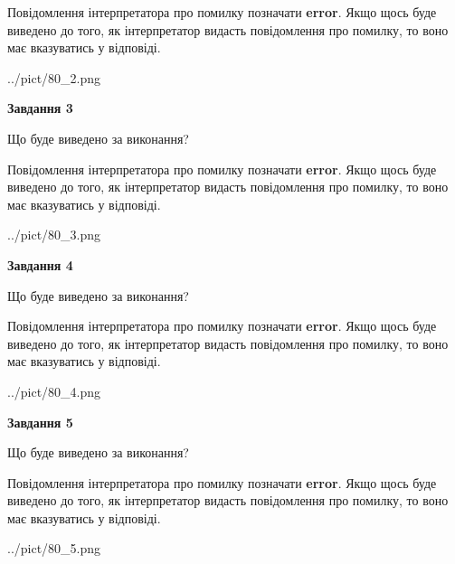 \documentclass[12pt, ukrainian]{article}
\begin{document}
{\begin {large}
Повідомлення інтерпретатора про помилку позначати \textbf{error}.
Якщо щось буде виведено до того, як інтерпретатор видасть повідомлення про помилку, 
то воно має вказуватись у відповіді. \par


\begin{center}
	{../pict/80_2.png}
\end{center}
\newpage

{\begin {center}\textbf{Завдання 3}\end {center}}\par
Що буде виведено за виконання?

Повідомлення інтерпретатора про помилку позначати \textbf{error}.
Якщо щось буде виведено до того, як інтерпретатор видасть повідомлення про помилку, 
то воно має вказуватись у відповіді. \par


\begin{center}
	{../pict/80_3.png}
\end{center}
\newpage

{\begin {center}\textbf{Завдання 4}\end {center}}\par
Що буде виведено за виконання?

Повідомлення інтерпретатора про помилку позначати \textbf{error}.
Якщо щось буде виведено до того, як інтерпретатор видасть повідомлення про помилку, 
то воно має вказуватись у відповіді. \par


\begin{center}
	{../pict/80_4.png}
\end{center}
\newpage

{\begin {center}\textbf{Завдання 5}\end {center}}\par
Що буде виведено за виконання?

Повідомлення інтерпретатора про помилку позначати \textbf{error}.
Якщо щось буде виведено до того, як інтерпретатор видасть повідомлення про помилку, 
то воно має вказуватись у відповіді. \par


\begin{center}
	{../pict/80_5.png}
\end{center}
\newpage


\end{large}}
\end{document}
